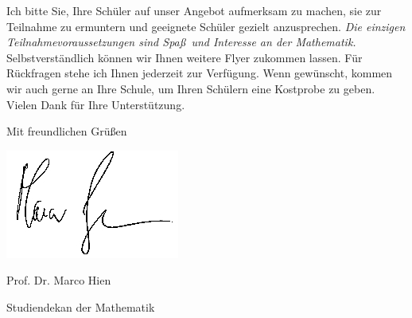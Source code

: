 \documentclass{serienbrief}
\newif\ifmore \moretrue
\begin{document}
Ich bitte Sie, Ihre Sch\"uler auf unser Angebot aufmerksam zu machen, sie zur
Teilnahme zu ermuntern und geeignete Sch\"uler gezielt
anzusprechen. \emph{Die einzigen Teilnahmevoraussetzungen sind Spa\ss\ und Interesse an der Mathematik.} Selbstverst\"andlich k\"onnen wir Ihnen weitere Flyer
zukommen lassen. F\"ur R\"uckfragen stehe ich Ihnen jederzeit zur Verf\"ugung. Wenn gew\"unscht, kommen wir auch
gerne an Ihre Schule, um Ihren Sch\"ulern eine Kostprobe zu geben. Vielen Dank f\"ur Ihre
Unterst\"utzung.

Mit freundlichen Gr\"u\ss en
\vspace{0.0cm}

\hspace{1cm} \includegraphics[scale=0.4]{unterschrift_marco_hien}

\vspace{-0.4cm}

Prof. Dr. Marco Hien

\vspace{-0.2cm}

{\small Studiendekan der Mathematik}

\newpage

 \fi
 \ifmore\repeat
 
 \closein\quelle
\end{document}
